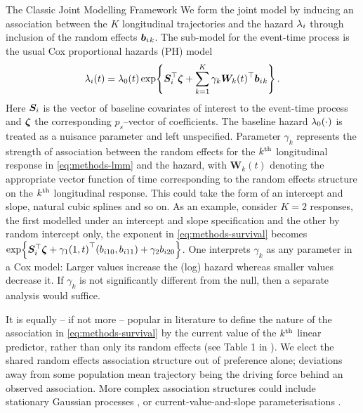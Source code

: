 \begin{chapter}{\label{cha:methods-classic}The Classic Joint Modelling Framework}
  We form the joint model by inducing an association between the $K$ longitudinal trajectories and the hazard $\lambda_i$ through inclusion of the random effects $\bm{b}_i{_k}$. The sub-model for the event-time process is the usual Cox proportional hazards (PH) model
  \begin{align}
       \lambda_i(t)=\lambda_0(t)\exp\!\left\{\bm{S}_i^\top\bm{\zeta} + \sum_{k=1}^K\gamma_k\bm{W}_k(t)^\top\bm{b}_i{_k}\right\}.
  \label{eq:methods-survival}
  \end{align}
  Here $\bm{S}_i$ is the vector of baseline covariates of interest to the event-time process and $\bm{\zeta}$ the corresponding $p_s$--vector of coefficients. The baseline hazard $\lambda_0(\cdot)$ is treated as a nuisance parameter and left unspecified. Parameter $\gamma_k$ represents the strength of association between the random effects for the $k^{\text{th}}$ longitudinal response in \eqref{eq:methods-lmm} and the hazard, with $\bm{W}_k(t)$ denoting the appropriate vector function of time corresponding to the random effects structure on the $k^{\text{th}}$ longitudinal response. This could take the form of an intercept and slope, natural cubic splines and so on. As an example, consider $K=2$ responses, the first modelled under an intercept and slope specification and the other by random intercept only, the exponent in \eqref{eq:methods-survival} becomes $\exp\!\left\{\bm{S}_i^\top\bm{\zeta} + \gamma_1\!\left(1, t\right)^\top\!\left( b_{i10}, b_{i11}\right) + \gamma_2b_{i20}\right\}$. One interprets $\gamma_k$ as any parameter in a Cox model: Larger values increase the (log) hazard whereas smaller values decrease it. If $\gamma_k$ is not significantly different from the null, then a separate analysis would suffice.  

  It is equally -- if not more -- popular in literature to define the nature of the association in \eqref{eq:methods-survival} by the current value of the $k^{\text{th}}$ linear predictor, rather than only its random effects (see \eg Table 1 in \citet{Hickey2016}). We elect the shared random effects association structure out of preference alone; deviations away from some population mean trajectory being the driving force behind an observed association. More complex association structures could include stationary Gaussian processes \citep{Henderson2000, Martins2022}, or current-value-and-slope parameterisations \citep{Rizopoulos2011B, Rustand2023}. 
  

\end{chapter}
